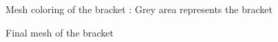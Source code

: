 \begin{figure}
    \centering
    \caption[Mesh coloring of the bracket]{Mesh coloring of the bracket : Grey area represents the bracket}
    \label{qdt_fig:ex_chole_mesh_coloring}
\end{figure}

\begin{figure}
    \centering
    \caption[Final mesh of the bracket]{Final mesh of the bracket}
    \label{qdt_fig:ex_chole_mesh_final}
\end{figure}


